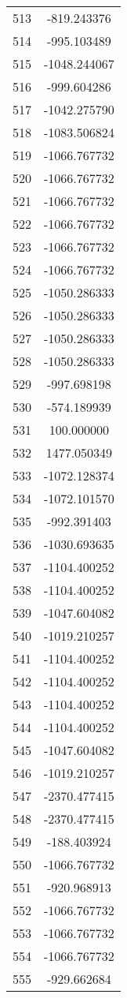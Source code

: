 \documentclass[12pt]{article}
\begin{document}
\begin{longtable}{@{}cc@{}}
513 & -819.243376 \\
514 & -995.103489 \\
515 & -1048.244067 \\
516 & -999.604286 \\
517 & -1042.275790 \\
518 & -1083.506824 \\
519 & -1066.767732 \\
520 & -1066.767732 \\
521 & -1066.767732 \\
522 & -1066.767732 \\
523 & -1066.767732 \\
524 & -1066.767732 \\
525 & -1050.286333 \\
526 & -1050.286333 \\
527 & -1050.286333 \\
528 & -1050.286333 \\
529 & -997.698198 \\
530 & -574.189939 \\
531 & 100.000000 \\
532 & 1477.050349 \\
533 & -1072.128374 \\
534 & -1072.101570 \\
535 & -992.391403 \\
536 & -1030.693635 \\
537 & -1104.400252 \\
538 & -1104.400252 \\
539 & -1047.604082 \\
540 & -1019.210257 \\
541 & -1104.400252 \\
542 & -1104.400252 \\
543 & -1104.400252 \\
544 & -1104.400252 \\
545 & -1047.604082 \\
546 & -1019.210257 \\
547 & -2370.477415 \\
548 & -2370.477415 \\
549 & -188.403924 \\
550 & -1066.767732 \\
551 & -920.968913 \\
552 & -1066.767732 \\
553 & -1066.767732 \\
554 & -1066.767732 \\
555 & -929.662684 \\

\end{longtable}
\end{document}
